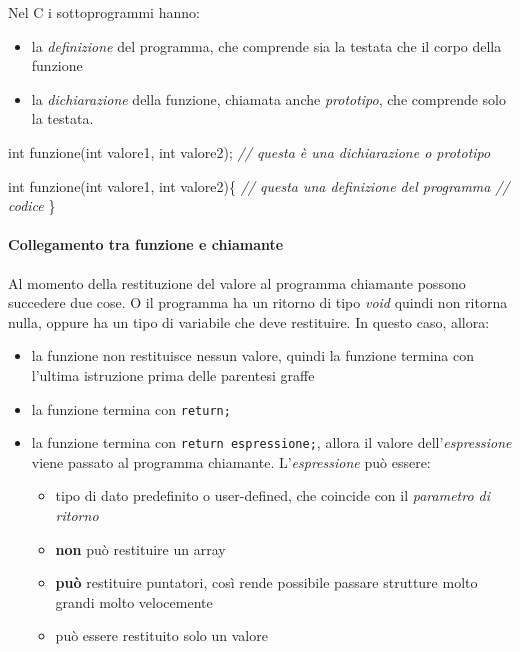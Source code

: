 \documentclass[
]{article}
\newenvironment{Shaded}{}{}
\newcommand{\CommentTok}[1]{\textcolor[rgb]{0.38,0.63,0.69}{\textit{#1}}}
\newcommand{\DataTypeTok}[1]{\textcolor[rgb]{0.56,0.13,0.00}{#1}}
\newcommand{\NormalTok}[1]{#1}
\begin{document}
Nel C i sottoprogrammi hanno:

\begin{itemize}
\item
  la \emph{definizione} del programma, che comprende sia la testata che
  il corpo della funzione
\item
  la \emph{dichiarazione} della funzione, chiamata anche
  \emph{prototipo}, che comprende solo la testata.
\end{itemize}

\begin{Shaded}
\begin{Highlighting}[]
\DataTypeTok{int}\NormalTok{ funzione(}\DataTypeTok{int}\NormalTok{ valore1, }\DataTypeTok{int}\NormalTok{ valore2); }\CommentTok{// questa è una dichiarazione o prototipo}

\DataTypeTok{int}\NormalTok{ funzione(}\DataTypeTok{int}\NormalTok{ valore1, }\DataTypeTok{int}\NormalTok{ valore2)\{ }\CommentTok{// questa una definizione del programma}
	\CommentTok{// codice}
\NormalTok{\}}
\end{Highlighting}
\end{Shaded}

\hypertarget{header-n798}{%
\paragraph{Collegamento tra funzione e chiamante}\label{header-n798}}

Al momento della restituzione del valore al programma chiamante possono
succedere due cose. O il programma ha un ritorno di tipo \emph{void}
quindi non ritorna nulla, oppure ha un tipo di variabile che deve
restituire. In questo caso, allora:

\begin{itemize}
\item
  la funzione non restituisce nessun valore, quindi la funzione termina
  con l'ultima istruzione prima delle parentesi graffe
\item
  la funzione termina con \texttt{return;}
\item
  la funzione termina con \texttt{return\ espressione;}, allora il
  valore dell'\emph{espressione} viene passato al programma chiamante.
  L'\emph{espressione} può essere:

  \begin{itemize}
  \item
    tipo di dato predefinito o user-defined, che coincide con il
    \emph{parametro di ritorno}
  \item
    \textbf{non} può restituire un array
  \item
    \textbf{può} restituire puntatori, così rende possibile passare
    strutture molto grandi molto velocemente
  \item
    può essere restituito solo un valore
  \end{itemize}
\end{itemize}
\end{document}
